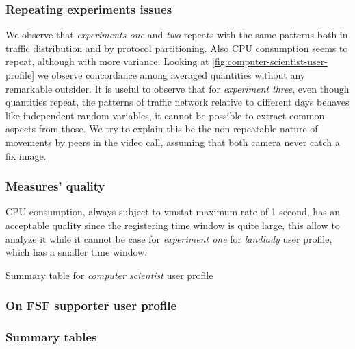\documentclass[10pt,a4paper]{article}
\begin{document}
    \subsubsection*{Repeating experiments issues}
    
    We observe that \emph{experiments one} and \emph{two} repeats with
    the same patterns both in traffic distribution and by protocol
    partitioning. Also CPU consumption seems to repeat, although with
    more variance. Looking at
    \autoref{fig:computer-scientist-user-profile} we observe
    concordance among averaged quantities without any remarkable
    outsider. It is useful to observe that for \emph{experiment
      three}, even though quantities repeat, the patterns of traffic
    network relative to different days behaves like independent random
    variables, it cannot be possible to extract common aspects from
    those. We try to explain this be the non repeatable nature of
    movements by peers in the video call, assuming that both camera
    never catch a fix image.


    \subsubsection*{Measures' quality}
    CPU consumption, always subject to vmstat maximum rate of 1
    second, has an acceptable quality since the registering time
    window is quite large, this allow to analyze it while it cannot be
    case for \emph{experiment one} for \emph{landlady} user profile,
    which has a smaller time window.

    \begin{table}
      \begin{adjustwidth}{-2cm}{}
            
      \end{adjustwidth}
      \caption{Summary table for \emph{computer scientist} user profile}
      \label{fig:computer-scientist-user-profile}
    \end{table}

    \newpage

    \subsubsection{On FSF supporter user profile}

    
    \subsubsection{Summary tables}
\end{document}
